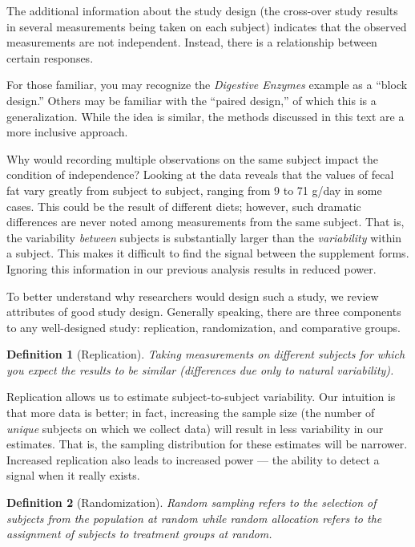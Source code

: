 \documentclass[
]{book}
\theoremstyle{plain}
\theoremstyle{mydefn}
\newtheorem{definition}{Definition}[chapter]
\theoremstyle{myexmpl}
\theoremstyle{remark}
\begin{document}
The additional information about the study design (the cross-over study results in several measurements being taken on each subject) indicates that the observed measurements are not independent. Instead, there is a relationship between certain responses.

\begin{rmdtip}
For those familiar, you may recognize the \emph{Digestive Enzymes} example as a ``block design.'' Others may be familiar with the ``paired design,'' of which this is a generalization. While the idea is similar, the methods discussed in this text are a more inclusive approach.
\end{rmdtip}

Why would recording multiple observations on the same subject impact the condition of independence? Looking at the data reveals that the values of fecal fat vary greatly from subject to subject, ranging from 9 to 71 g/day in some cases. This could be the result of different diets; however, such dramatic differences are never noted among measurements from the same subject. That is, the variability \emph{between} subjects is substantially larger than the \emph{variability} within a subject. This makes it difficult to find the signal between the supplement forms. Ignoring this information in our previous analysis results in reduced power.

To better understand why researchers would design such a study, we review attributes of good study design. Generally speaking, there are three components to any well-designed study: replication, randomization, and comparative groups.

\begin{definition}[Replication]
Taking measurements on different subjects for which you expect the results to be similar (differences due only to natural variability).
\end{definition}

Replication allows us to estimate subject-to-subject variability. Our intuition is that more data is better; in fact, increasing the sample size (the number of \emph{unique} subjects on which we collect data) will result in less variability in our estimates. That is, the sampling distribution for these estimates will be narrower. Increased replication also leads to increased power --- the ability to detect a signal when it really exists.

\begin{definition}[Randomization]
Random sampling refers to the selection of subjects from the population at random while random allocation refers to the assignment of subjects to treatment groups at random.
\end{definition}
\end{document}
